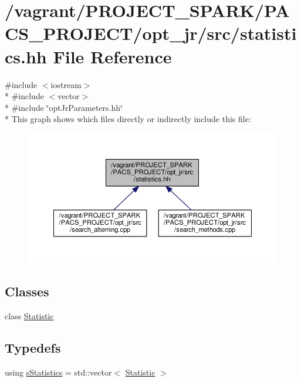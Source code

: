 \hypertarget{statistics_8hh}{\section{/vagrant/\-P\-R\-O\-J\-E\-C\-T\-\_\-\-S\-P\-A\-R\-K/\-P\-A\-C\-S\-\_\-\-P\-R\-O\-J\-E\-C\-T/opt\-\_\-jr/src/statistics.hh File Reference}
\label{statistics_8hh}
}
{\ttfamily \#include $<$iostream$>$}\\*
{\ttfamily \#include $<$vector$>$}\\*
{\ttfamily \#include \char`\"{}opt\-Jr\-Parameters.\-hh\char`\"{}}\\*
This graph shows which files directly or indirectly include this file\-:
\nopagebreak
\begin{figure}[H]
\begin{center}
\leavevmode
\includegraphics[width=350pt]{statistics_8hh__dep__incl}
\end{center}
\end{figure}
\subsection*{Classes}
\begin{DoxyCompactItemize}
\item 
class \hyperlink{classStatistic}{Statistic}
\end{DoxyCompactItemize}
\subsection*{Typedefs}
\begin{DoxyCompactItemize}
\item 
using \hyperlink{statistics_8hh_abd0800e960b601bba1c0734f6f8e4949}{s\-Statistics} = std\-::vector$<$ \hyperlink{classStatistic}{Statistic} $>$
\end{DoxyCompactItemize}
